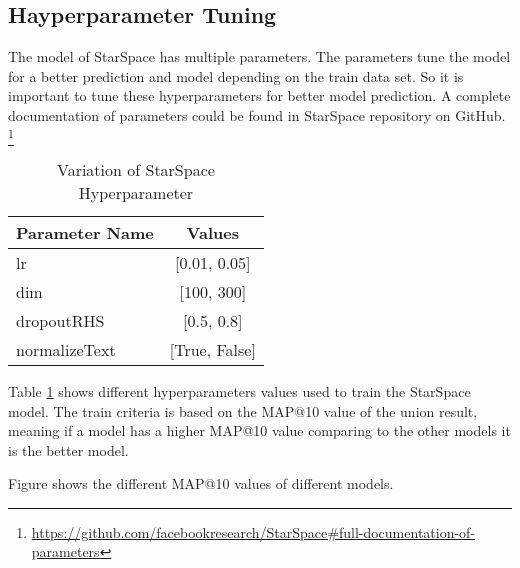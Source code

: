 \subsection{Hayperparameter Tuning}
\label{subsec:hyperparameter-tuning}
The model of StarSpace has multiple parameters. The parameters tune the model for a better prediction and model depending on the train data set. So it is important to tune these hyperparameters for better model prediction. A complete documentation of parameters could be found in StarSpace repository on GitHub. \footnote{\url{https://github.com/facebookresearch/StarSpace\#full-documentation-of-parameters}}

\begin{table}[!h]
	\centering
	\caption{Variation of StarSpace Hyperparameter}
	\label{tab:hyperparameter-variations}
	\begin{tabular}{|l|c|}
		\hline
		\textbf{Parameter Name} & \textbf{Values} \\
		\hline
		lr & [0.01, 0.05] \\
		\hline
		dim & [100, 300] \\
		\hline
		dropoutRHS & [0.5, 0.8] \\
		\hline
		normalizeText & [True, False]\\
		\hline
	\end{tabular}
\end{table}

Table \ref{tab:hyperparameter-variations} shows different hyperparameters values used to train the StarSpace model. The train criteria is based on the MAP@10 value of the union result, meaning if a model has a higher MAP@10 value comparing to the other models it is the better model.


Figure  shows the different MAP@10 values of different models.

